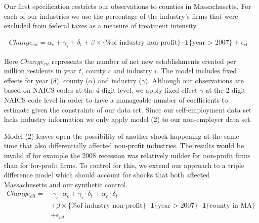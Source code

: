\documentclass[12pt]{article}
\begin{document}
Our first specification restricts our observations to counties in Massachusetts. For each of our industries we use the percentage of the industry's firms that were excluded from federal taxes as a measure of treatment intensity. 
\begin{comment}

We interpret our coefficient of interest as a lower bound estimate of the health care shock impact. It is a lower bound because for-profit industries may have also benefited and we are measuring the difference between the two sets of industries.

\begin{align}
Change_{cit} = \alpha_c + \gamma_i + \delta_t + \beta \, \mathbf{1}\{\text{non-profit industry}\} \cdot \mathbf{1}\{\text{year > 2007}\} + \epsilon_{ct}
\end{align}

\begin{align}
Change_{cit} = & \; \gamma_i \cdot \alpha_c + \gamma_i \cdot \delta_t +  \alpha_c \cdot \delta_t \nonumber   \\
& + \beta \, \mathbf{1}\{\text{non-profit industry}\} \cdot \mathbf{1}\{\text{year > 2007}\}  \cdot \mathbf{1}\{\text{county in  MA}\} \nonumber  \\
& + \epsilon_{ict}
\end{align}

\end{comment}
\begin{align}
Change_{cit} = \alpha_c + \gamma_i + \delta_t + \beta \times \{\text{\% of industry non-profit}\} \cdot \mathbf{1}\{\text{year > 2007}\} + \epsilon_{ct}
\end{align}

Here $Change_{cit}$ represents the number of net new establishments created per million residents in year $t$, county $c$ and industry $i$. The model includes fixed effects for year ($\delta$), county ($\alpha$) and industry ($\gamma$). Although our observations are based on NAICS codes at the 4 digit level, we apply fixed effect $\gamma$ at the 2 digit NAICS code level in order to have a manageable number of coefficients to estimate given the constraints of our data set. Since our self-employment data set lacks industry information we only apply model (2) to our non-employer data set. 

Model (2) leaves open the possibility of another shock happening at the same time that also differentially affected non-profit industries. The results would be invalid if for example the 2008 recession was relatively milder for non-profit firms than for for-profit firms. To control for this, we extend our approach to a triple difference model which should account for shocks that both affected Massachusetts and our synthetic control. 
\begin{align}
Change_{cit} = & \; \gamma_i \cdot \alpha_c + \gamma_i \cdot \delta_t +  \alpha_c \cdot \delta_t \nonumber   \\
& + \beta  \times \{\text{\% of industry non-profit}\} \cdot \mathbf{1}\{\text{year > 2007}\}  \cdot \mathbf{1}\{\text{county in  MA}\} \nonumber  \\
& + \epsilon_{ict}
\end{align}
\end{document}
